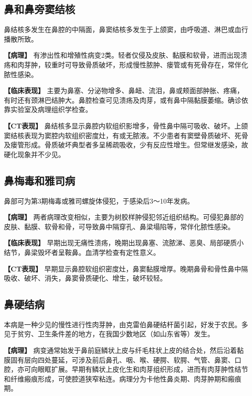 \subsection{鼻和鼻旁窦结核}

鼻结核多发生在鼻腔的中隔面，鼻窦结核多发生于上颌窦，由呼吸道、淋巴或血行播散所致。

\textbf{【病理】}
有渗出性和增殖性病变2类。轻者仅侵及皮肤、黏膜和软骨，进而出现溃疡和肉芽肿，较重时可导致骨质破坏，形成慢性脓肿、瘘管或有死骨存在，常伴化脓性感染。

\textbf{【临床表现】}
主要为鼻塞、分泌物增多、鼻衄、流泪，鼻或颊面部肿胀、疼痛，有时还有颈淋巴结肿大。鼻腔检查可见溃疡及肉芽，或有鼻中隔黏膜萎缩。确诊依靠实验室及病理组织学检查。

\textbf{【CT表现】}
鼻结核多显示鼻腔内软组织影增多，骨性鼻中隔可吸收、破坏。上颌窦结核表现为窦腔内软组织密度灶，有或无脓液。不少患者有窦壁骨质破坏、死骨及瘘管形成。骨质破坏典型者多呈稀疏吸收，少有反应性增生。但常继发感染，故硬化现象并不少见。

\subsection{鼻梅毒和雅司病}

鼻部可为第3期梅毒或雅司螺旋体侵犯，于感染后3～10年发病。

\textbf{【病理】}
两者病理改变相似，主要为树胶样肿侵犯邻近组织结构。可侵犯鼻部的皮肤、黏膜、软骨和骨，可导致鼻中隔穿孔、鼻梁塌陷等，常伴化脓性感染。

\textbf{【临床表现】}
早期出现无痛性溃疡，晚期出现鼻塞、流脓涕、恶臭、局部硬质小结节，鼻梁毁坏者呈鞍鼻。血清学检查有定性意义。

\textbf{【CT表现】}
早期显示鼻腔软组织密度灶，鼻窦黏膜增厚。晚期鼻骨和骨性鼻中隔吸收、破坏、消失，鼻窦骨质硬化、增生，破坏较轻。

\subsection{鼻硬结病}

本病是一种少见的慢性进行性肉芽肿，由克雷伯鼻硬结杆菌引起，好发于农民。多见于贫穷、卫生条件差的地方，在我国少数地区（如山东省等）发生。

\textbf{【病理】}
病变通常始发于鼻前庭鳞状上皮与纤毛柱状上皮的结合处，然后沿着黏膜固有层向四处蔓延，可涉及前后鼻孔、咽、喉、硬腭、软腭、气管、鼻窦、口腔，亦可向眼眶扩展。早期有鳞状上皮化生和肉芽组织形成，进而有肉芽肿性结节和纤维瘢痕形成，可使腔道狭窄粘连。病理分为卡他性鼻炎期、肉芽肿期和瘢痕期。

